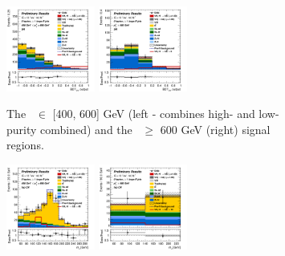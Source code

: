 \vspace*{\fill}
\begin{figure}[h!]
    \centering
    \begin{subfigure}[b]{\textwidth}
        \centering
        \includegraphics[width=0.32\textwidth]{Images/VH/Own_fit/postfit_VHbb/Region_distmva_BMax600_BMin400_incFat1_Fat1_DSRnoaddbjetsr_J0_TTypebb_incJet1_T2_L0_Y6051_GlobalFit_conditionnal_mu1.png}
        \includegraphics[width=0.32\textwidth]{Images/VH/Own_fit/postfit_VHbb/Region_distmva_BMin600_incFat1_Fat1_DSRnoaddbjetsr_J0_TTypebb_incJet1_T2_L0_Y6051_GlobalFit_conditionnal_mu1.png}
        \caption{The \ptv\ $\in$ [400, 600] GeV (left - combines high- and low-purity combined) and the \ptv\ $\geq$ 600 GeV (right) signal regions.}
        \label{fig:plots_VHbbBoost_OL_SR}
    \end{subfigure}
    \begin{subfigure}[b]{\textwidth}
        \centering
        \includegraphics[width=0.32\textwidth]{Images/VH/Own_fit/postfit_VHbb/Region_distmBB_BMax600_BMin400_incFat1_Fat1_DSRtopaddbjetcr_J0_TTypebb_incJet1_T2_L0_Y6051_GlobalFit_conditionnal_mu1.png}
        \includegraphics[width=0.32\textwidth]{Images/VH/Own_fit/postfit_VHbb/Region_distmBB_BMin600_incFat1_Fat1_DSRtopaddbjetcr_J0_TTypebb_incJet1_T2_L0_Y6051_GlobalFit_conditionnal_mu1.png}

\end{subfigure}
\end{figure}
